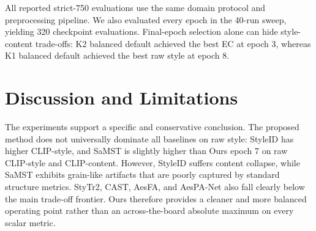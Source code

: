 ﻿\documentclass[letterpaper]{article}
\begin{document}
All reported strict-750 evaluations use the same domain protocol and preprocessing pipeline. We also evaluated every epoch in the 40-run sweep, yielding 320 checkpoint evaluations. Final-epoch selection alone can hide style-content trade-offs: K2 balanced default achieved the best EC at epoch 3, whereas K1 balanced default achieved the best raw style at epoch 8.

\begin{table}[t]
\centering
\caption{Unified efficiency profiling. ``Prof img/s'' measures latent-generator throughput under a common micro-benchmark, whereas ``E2E img/s'' measures the full strict-750 inference path including file I/O and decoding. Training times marked with $\dagger$ are extrapolated from a single-epoch or single-iteration probe multiplied by the total training length.}
\label{tab:runtime}
\end{table}

\section{Discussion and Limitations}
The experiments support a specific and conservative conclusion. The proposed method does not universally dominate all baselines on raw style: StyleID has higher CLIP-style, and SaMST is slightly higher than Ours epoch 7 on raw CLIP-style and CLIP-content. However, StyleID suffers content collapse, while SaMST exhibits grain-like artifacts that are poorly captured by standard structure metrics. StyTr2, CAST, AesFA, and AesPA-Net also fall clearly below the main trade-off frontier. Ours therefore provides a cleaner and more balanced operating point rather than an across-the-board absolute maximum on every scalar metric.
\end{document}
